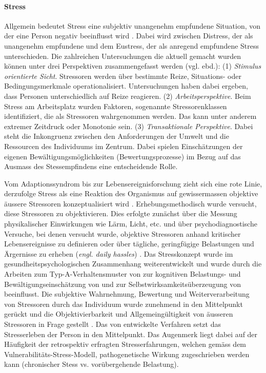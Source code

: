 \paragraph{Stress}\label{sec:Stress}
Allgemein bedeutet Stress eine subjektiv unangenehm empfundene Situation, von der eine Person negativ beeinflusst wird \cite[S.~1500]{Stress2014}. Dabei wird zwischen Distress, der als unangenehm empfundene und dem Eustress, der als anregend empfundene Stress unterschieden. Die zahlreichen Untersuchungen die aktuell gemacht wurden können unter drei Perspektiven zusammengefasst werden (vgl. ebd.): (1) \textit{Stimulus orientierte Sicht}. Stressoren werden über bestimmte Reize, Situations- oder Bedingungsmerkmale operationalisiert. Untersuchungen haben dabei ergeben, dass Personen unterschiedlich auf Reize reagieren. (2) \textit{Arbeitsperspektive}. Beim Stress am Arbeitsplatz wurden Faktoren, sogenannte Stressorenklassen identifiziert, die als Stressoren wahrgenommen werden. Das kann unter anderem extremer Zeitdruck oder Monotonie sein. (3) \textit{Transaktionale Perspektive}. Dabei steht die Inkongruenz zwischen den Anforderungen der Umwelt und die Ressourcen des Individuums im Zentrum. Dabei spielen Einschätzungen der eigenen Bewältigungsmöglichkeiten (Bewertungsprozesse) im Bezug auf das Ausmass des Stessempfindens eine entscheidende Rolle. 

Vom Adaptionssyndrom \cite{Selye1936} bis zur Lebensereignisforschung zieht sich eine rote Linie, derzufolge Stress als eine Reaktion des Organismus auf gewissermassen objektive äussere Stressoren konzeptualisiert wird \cite{Fliege2001}. Erhebungsmethodisch wurde versucht, diese Stressoren zu objektivieren. Dies erfolgte zunächst über die Messung physikalischer Einwirkungen wie Lärm, Licht, etc. und über psychodiagnostische Versuche, bei denen versucht wurde, objektive Stressoren anhand kritischer Lebensereignisse zu definieren \cite{Holmes1980} oder über tägliche, geringfügige Belastungen und Ärgernisse zu erheben (\textit{engl. daily hassles}) \cite{Quast1986}. Das Stresskonzept wurde im gesundheitspsychologischen Zusammenhang weiterentwickelt und wurde durch die Arbeiten zum Typ-A-Verhaltensmuster von  zur kognitiven Belastungs- und Bewältigungseinschätzung von  und zur Selbstwirksamkeitsüberzeugung von  beeinflusst. Die subjektive Wahrnehmung, Bewertung und Weiterverarbeitung von Stressoren durch das Individuum wurde zunehmend in den Mittelpunkt gerückt und die Objektivierbarkeit und Allgemeingültigkeit von äusseren Stressoren in Frage gestellt \cite{Fliege2001}. Das von  entwickelte Verfahren setzt das Stresserleben der Person in den Mittelpunkt. Das Augenmerk liegt dabei auf der Häufigkeit der retrospektiv erfragten Stresserfahrungen, welchen gemäss dem Vulnerabilitäts-Stress-Modell, pathogenetische Wirkung zugeschrieben werden kann (chronischer Stess vs. vorübergehende Belastung).

